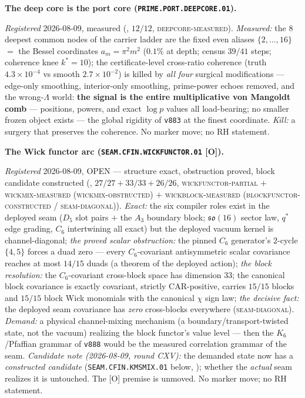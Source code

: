 \par\smallskip\noindent\textbf{The deep core is the port core
(\texttt{PRIME.PORT.\allowbreak DEEPCORE.01}).}
{\sloppy
\emph{Registered} 2026-08-09, measured
(, $12/12$,
\textsc{deepcore-measured}).  \emph{Measured:} the $8$ deepest
common nodes of the carrier ladder are the fixed even aliases
$\{2, \dots, 16\}$ $=$ the Bessel coordinates $a_m = \pi^2
m^2$ ($0.1\%$ at depth; census $39/41$ steps; coherence knee
$k^{*} = 10$); the certificate-level cross-ratio coherence
(truth $4.3\times10^{-4}$ vs smooth $2.7\times10^{-2}$) is
killed by \emph{all four} surgical modifications --- edge-only
smoothing, interior-only smoothing, prime-power echoes
removed, and the wrong-$\Lambda$ world: \textbf{the signal is
the entire multiplicative von Mangoldt comb} --- positions,
powers, and exact $\log p$ values all load-bearing; no smaller
frozen object exists --- the global rigidity of \texttt{v883}
at the finest coordinate.  \emph{Kill:} a surgery that
preserves the coherence.  No marker move; no RH
statement.\par}


\par\smallskip\noindent\textbf{The Wick functor arc
(\texttt{SEAM.CFIN.\allowbreak WICKFUNCTOR.01} [O]).}
{\sloppy
\emph{Registered} 2026-08-09, OPEN --- structure exact,
obstruction proved, block candidate constructed
(, $27/27 + 33/33 +
26/26$, \textsc{wickfunctor-partial} $+$
\textsc{wickmix-measured (wickmix-obstructed)} $+$
\textsc{wickblock-measured (blockfunctor-constructed /
seam-diagonal)}).  \emph{Exact:} the six compiler roles exist
in the deployed seam ($D_5$ slot pairs $+$ the $A_3$ boundary
block; $\mathfrak{so}(16)$ sector law, $q^{*}$ edge grading,
$C_6$ intertwining all exact) but the deployed vacuum kernel
is channel-diagonal; \emph{the proved scalar obstruction:} the
pinned $C_6$ generator's $2$-cycle $\{4, 5\}$ forces a duad
zero --- every $C_6$-covariant antisymmetric scalar covariance
reaches at most $14/15$ duads (a theorem of the deployed
action); \emph{the block resolution:} the $C_6$-covariant
cross-block space has dimension $33$; the canonical block
covariance is exactly covariant, strictly CAR-positive,
carries $15/15$ blocks and $15/15$ block Wick monomials with
the canonical $\chi$ sign law; \emph{the decisive fact:} the
deployed seam covariance has \emph{zero} cross-blocks
everywhere (\textsc{seam-diagonal}).  \emph{Demand:} a
physical channel-mixing mechanism (a
boundary/transport-twisted state, not the vacuum) realizing
the block functor's value level --- then the $K_6$/Pfaffian
grammar of \texttt{v888} would be the measured correlation
grammar of the seam.  \emph{Candidate note (2026-08-09, round
CXV):} the demanded state now has a \emph{constructed
candidate} (\texttt{SEAM.CFIN.KMSMIX.01} below,
); whether the \emph{actual}
seam realizes it is untouched.  The [O] premise is unmoved.  No
marker move; no RH statement.\par}

